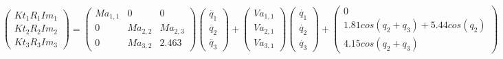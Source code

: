 \[
	\begin{pmatrix}
	Kt_{1}R_{1}Im_{1} \\
	Kt_{2}R_{2}Im_{2} \\
	Kt_{3}R_{3}Im_{3}
	\end{pmatrix} =
	\begin{pmatrix}
	Ma_{1,1} & 0 & 0 \\
	0 & Ma_{2,2} & Ma_{2,3}\\
	0 & Ma_{3,2} & 2.463
	\end{pmatrix}
	\begin{pmatrix}
	\ddot{q_{1}} \\
	\ddot{q_{2}}  \\
	\ddot{q_{3}}
\end{pmatrix} +
\begin{pmatrix}
	Va_{1,1}\\
	Va_{2,1} \\
  Va_{3,1}
\end{pmatrix}
\begin{pmatrix}
		\dot{q_{1}} \\
		\dot{q_{2}}  \\
		\dot{q_{3}}
\end{pmatrix} +
\begin{pmatrix}
 	0 \\
  1.81cos(q_{2} + q_{3}) + 5.44cos(q_{2}) \\
                 4.15cos(q_{2} + q_{3})
\end{pmatrix}
\]

